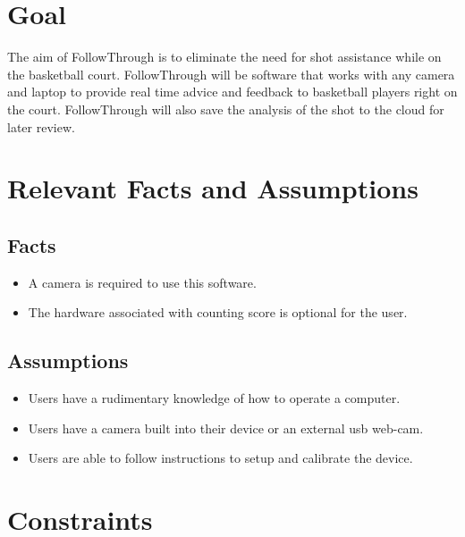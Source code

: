 \newpage
\section{Goal}
\hspace*{4mm}The aim of FollowThrough is to eliminate the need for shot assistance while on the basketball court. FollowThrough will be software that works with any camera and laptop to provide real time advice and feedback to basketball players right on the court. FollowThrough will also save the analysis of the shot to the cloud for later review.

\section{Relevant Facts and Assumptions}
\subsection{Facts}
\begin{itemize}
    \item A camera is required to use this software.
    \item The hardware associated with counting score is optional for the user.
\end{itemize}

\subsection{Assumptions}
\begin{itemize}
    \item Users have a rudimentary knowledge of how to operate a computer.
    \item Users have a camera built into their device or an external usb web-cam.
    \item Users are able to follow instructions to setup and calibrate the device.
\end{itemize}

\section{Constraints}
